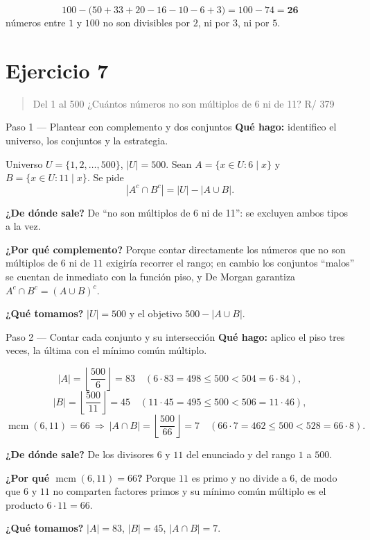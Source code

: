 \documentclass[11pt]{article}
\begin{document}
\begin{resp}
\[
100 - \bigl(50+33+20-16-10-6+3\bigr) = 100-74 = \mathbf{26}
\]
números entre $1$ y $100$ no son divisibles por $2$, ni por $3$, ni por $5$.
\end{resp}

\section*{Ejercicio 7}

\begin{quote}
Del 1 al 500 ¿Cuántos números no son múltiplos de 6 ni de 11? \hfill R/ 379
\end{quote}

\begin{paso}{Paso 1 --- Plantear con complemento y dos conjuntos}
\textbf{Qué hago:} identifico el universo, los conjuntos y la estrategia.

Universo $U=\{1,2,\dots,500\}$, $|U|=500$. Sean $A=\{x\in U: 6\mid x\}$ y $B=\{x\in U:11\mid x\}$. Se pide
\[
|A^{c}\cap B^{c}| = |U| - |A\cup B| .
\]

\textbf{¿De dónde sale?} De ``no son múltiplos de 6 ni de 11'': se excluyen ambos tipos a la vez.

\textbf{¿Por qué complemento?} Porque contar directamente los números que no son múltiplos de $6$ ni de $11$ exigiría recorrer el rango; en cambio los conjuntos ``malos'' se cuentan de inmediato con la función piso, y De Morgan garantiza $A^c\cap B^c = (A\cup B)^c$.

\textbf{¿Qué tomamos?} $|U|=500$ y el objetivo $500-|A\cup B|$.
\end{paso}

\begin{paso}{Paso 2 --- Contar cada conjunto y su intersección}
\textbf{Qué hago:} aplico el piso tres veces, la última con el mínimo común múltiplo.

\[
|A| = \left\lfloor \frac{500}{6}\right\rfloor = 83 \quad (6\cdot 83 = 498\le 500 < 504 = 6\cdot 84),
\]
\[
|B| = \left\lfloor \frac{500}{11}\right\rfloor = 45 \quad (11\cdot 45 = 495\le 500 < 506 = 11\cdot 46),
\]
\[
\operatorname{mcm}(6,11) = 66 \ \Longrightarrow\ |A\cap B| = \left\lfloor \frac{500}{66}\right\rfloor = 7 \quad (66\cdot 7 = 462\le 500 < 528 = 66\cdot 8).
\]

\textbf{¿De dónde sale?} De los divisores $6$ y $11$ del enunciado y del rango $1$ a $500$.

\textbf{¿Por qué $\operatorname{mcm}(6,11)=66$?} Porque $11$ es primo y no divide a $6$, de modo que $6$ y $11$ no comparten factores primos y su mínimo común múltiplo es el producto $6\cdot 11 = 66$.

\textbf{¿Qué tomamos?} $|A|=83$, $|B|=45$, $|A\cap B|=7$.
\end{paso}
\end{document}
